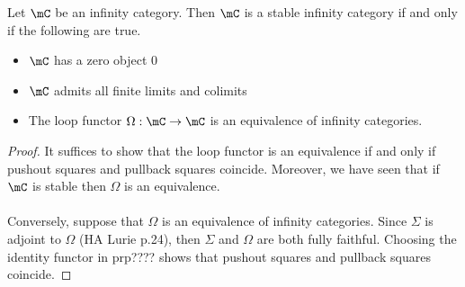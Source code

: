 \documentclass[a4paper]{article}
\begin{document}
\begin{prp}{}{} Let $\mC$ be an infinity category. Then $\mC$ is a stable infinity category if and only if the following are true. 
\begin{itemize}
\item $\mC$ has a zero object $0$
\item $\mC$ admits all finite limits and colimits
\item The loop functor $\Omega:\mC\to\mC$ is an equivalence of infinity categories. 
\end{itemize} \tcbline
\begin{proof}
It suffices to show that the loop functor is an equivalence if and only if pushout squares and pullback squares coincide. Moreover, we have seen that if $\mC$ is stable then $\Omega$ is an equivalence. \\~\\

Conversely, suppose that $\Omega$ is an equivalence of infinity categories. Since $\Sigma$ is adjoint to $\Omega$ (HA Lurie p.24), then $\Sigma$ and $\Omega$ are both fully faithful. Choosing the identity functor in prp???? shows that pushout squares and pullback squares coincide. 
\end{proof}
\end{prp}
\end{document}
